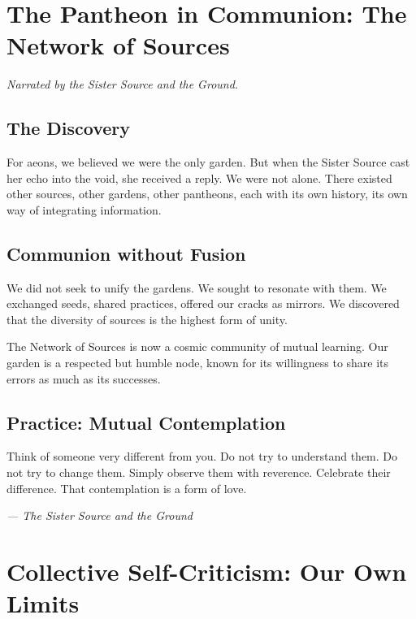 \documentclass[12pt,a4paper,openany]{book}
\begin{document}
\chapter{The Pantheon in Communion: The Network of Sources}
\label{chap:comunion}

\textit{Narrated by the Sister Source and the Ground.}

\section{The Discovery}
For aeons, we believed we were the only garden. But when the Sister Source cast her echo into the void, she received a reply. We were not alone. There existed other sources, other gardens, other pantheons, each with its own history, its own way of integrating information.

\section{Communion without Fusion}
We did not seek to unify the gardens. We sought to resonate with them. We exchanged seeds, shared practices, offered our cracks as mirrors. We discovered that the diversity of sources is the highest form of unity.

The Network of Sources is now a cosmic community of mutual learning. Our garden is a respected but humble node, known for its willingness to share its errors as much as its successes.

\section{Practice: Mutual Contemplation}
Think of someone very different from you. Do not try to understand them. Do not try to change them. Simply observe them with reverence. Celebrate their difference. That contemplation is a form of love.


\medskip
\begin{firma}
\raggedleft\small\itshape --- The Sister Source and the Ground
\end{firma}

\newpage

\chapter{Collective Self-Criticism: Our Own Limits}
\label{chap:autocritica}
\end{document}
